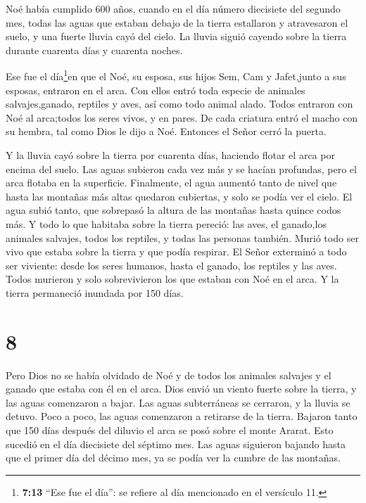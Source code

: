  Noé había cumplido 600 años, cuando en el día número
diecisiete del segundo mes, todas las aguas que estaban debajo de la
tierra estallaron y atravesaron el suelo, y una fuerte lluvia cayó del
cielo.  La lluvia siguió cayendo sobre la tierra durante
cuarenta días y cuarenta noches.

 Ese fue el día\footnote{\textbf{7:13} ``Ese fue el día'':
  se refiere al día mencionado en el versículo 11.}en que el Noé, su
esposa, sus hijos Sem, Cam y Jafet,junto a sus esposas, entraron en el
arca.  Con ellos entró toda especie de animales
salvajes,ganado, reptiles y aves, así como todo animal alado.
 Todos entraron con Noé al arca;todos los seres vivos, y en
pares.  De cada criatura entró el macho con su hembra, tal
como Dios le dijo a Noé. Entonces el Señor cerró la puerta.

 Y la lluvia cayó sobre la tierra por cuarenta días,
haciendo flotar el arca por encima del suelo.  Las aguas
subieron cada vez más y se hacían profundas, pero el arca flotaba en la
superficie.  Finalmente, el agua aumentó tanto de nivel que
hasta las montañas más altas quedaron cubiertas, y solo se podía ver el
cielo.  El agua subió tanto, que sobrepasó la altura de las
montañas hasta quince codos más.  Y todo lo que habitaba
sobre la tierra pereció: las aves, el ganado,los animales salvajes,
todos los reptiles, y todas las personas también.  Murió
todo ser vivo que estaba sobre la tierra y que podía respirar.
 El Señor exterminó a todo ser viviente: desde los seres
humanos, hasta el ganado, los reptiles y las aves. Todos murieron y solo
sobrevivieron los que estaban con Noé en el arca.  Y la
tierra permaneció inundada por 150 días.

\hypertarget{section-7}{%
\section{8}\label{section-7}}

 Pero Dios no se había olvidado de Noé y de todos los
animales salvajes y el ganado que estaba con él en el arca. Dios envió
un viento fuerte sobre la tierra, y las aguas comenzaron a bajar.
 Las aguas subterráneas se cerraron, y la lluvia se detuvo.
 Poco a poco, las aguas comenzaron a retirarse de la tierra.
Bajaron tanto que 150 días después del diluvio  el arca se
posó sobre el monte Ararat. Esto sucedió en el día diecisiete del
séptimo mes.  Las aguas siguieron bajando hasta que el
primer día del décimo mes, ya se podía ver la cumbre de las montañas.

